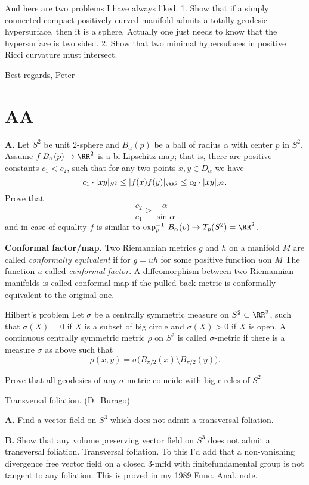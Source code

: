 And here are two problems I have always liked.
1. Show that if a
simply connected
compact positively curved manifold admits a totally geodesic hypersurface,
then it is a sphere. Actually one just needs to know that the hypersurface
is two sided.
2. Show that two minimal hypersufaces in positive Ricci curvature must
intersect.

Best regards, Peter








\chapter{AA}

{\bf A.} Let $S^2$ be unit $2$-sphere and
$B_\alpha(p)$ be a ball of
radius $\alpha$ with center $p$ in $S^2$.
Assume $f\:B_\alpha(p)\to \RR^2$ is a bi-Lipschitz map;
that is, there are positive constants $c_1 < c_2$, such that for any two points
$x,y\in D_\alpha$ we have
$$c_1\cdot |x y|_{S^2}\le |f(x)f(y)|_{\RR^2} \le c_2\cdot|x y|_{S^2}.$$
Prove that
$$\frac{c_2}{c_1}\ge \frac{\alpha}{\sin\alpha}$$
and in case of equality
$f$ is similar to $\exp_p^{-1}\:B_\alpha(p)\to T_p(S^2)=\RR^2$.

\item{\bf Conformal factor/map.} Two Riemannian metrics $g$ and $h$ on a manifold $M$ are called {\it conformally equivalent} if for $g=u h$ for some positive function $u$on $M$
The function $u$ called {\it conformal factor}.
A diffeomorphism between two Riemannian manifolds is called conformal map if the pulled back metric is conformally equivalent to the original one.

\begin{pr}{}{Hilbert's problem} Let $\sigma$ be a centrally
symmetric measure on $S^2\subset \RR^3$, such that $\sigma(X)=0$ if $X$ is a
subset of big circle and $\sigma(X)>0$ if $X$ is open.
A continuous centrally symmetric metric $\rho$ on $S^2$
is called $\sigma$-metric
if there is a measure $\sigma$ as above such that
$$\rho(x,y)=\sigma\bigl(B_{\pi/2}(x)\setminus B_{\pi/2}(y)\bigr).$$

Prove that all geodesics of any $\sigma$-metric coincide with big circles
of $S^2$.
\end{pr}

\begin{pr}{}
{Transversal foliation.} (D.~Burago)

{\bf A.} Find a vector field on $S^3$ which does not admit a transversal foliation.

{\bf B.} Show that any volume preserving vector field on $S^3$ does not admit a transversal foliation.
Transversal foliation. To this I'd add that a non-vanishing divergence free vector field on a closed 3-mfld with finitefundamental group is not tangent to any foliation. This is proved in my 1989 Func. Anal. note.
\end{pr}

